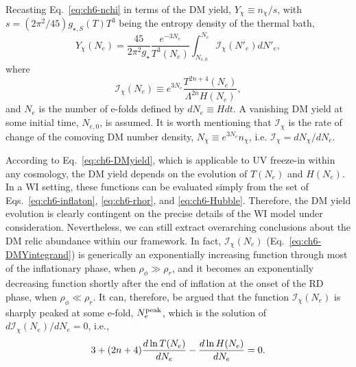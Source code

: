 Recasting Eq.~\eqref{eq:ch6-nchi} in terms of the DM yield, $Y_\chi\equiv n_\chi / s$, with $s=(2\pi^2/45)g_{\star, S}(T)T^3$ being the entropy density of the thermal bath,
\begin{equation}
 Y_\chi(N_e)=\frac{45}{2\pi^2g_\star}\frac{e^{-3N_e}}{ T^3(N_e)}\int_{N_{e, 0}}^{N_e}\mathcal{I}_\chi(N'_e) dN'_e,
 \label{eq:ch6-DMyield}
\end{equation}
where
\begin{equation}
    \mathcal{I}_\chi(N_e)\equiv e^{3N_e}\frac{T^{2n+4}(N_e)}{\Lambda^{2n}H(N_e)}, \label{eq:ch6-DMYintegrand}
\end{equation}
and $N_e$ is the number of e-folds defined by $dN_e\equiv Hdt$. A vanishing DM yield at some initial time, $N_{e, 0}$, is assumed.
It is worth mentioning that $\mathcal{I}_\chi$ is the rate of change of the comoving DM number density, $N_\chi\equiv e^{3N_e}n_\chi$, i.e.  $\mathcal{I}_\chi= dN_\chi/dN_e$.

According to Eq.~\eqref{eq:ch6-DMyield}, which is applicable to UV freeze-in within any cosmology, the DM yield depends on the evolution of $T(N_e)$ and $H(N_e)$. In a WI setting, these functions can be evaluated simply from the set of Eqs.~\eqref{eq:ch6-inflaton}, \eqref{eq:ch6-rhor}, and \eqref{eq:ch6-Hubble}. Therefore, the DM yield evolution is clearly contingent on the precise details of the WI model under consideration.
Nevertheless, we can still extract overarching conclusions about the DM relic abundance within our framework. In fact, $\mathcal{I}_\chi(N_e)$ (Eq.~\eqref{eq:ch6-DMYintegrand}) is generically an exponentially increasing function through most of the inflationary phase, when $\rho_\phi\gg \rho_r$, and it becomes an exponentially decreasing function shortly after the end of inflation at the onset of the RD phase, when $\rho_\phi\ll \rho_r$. It can, therefore, be argued that the function $\mathcal{I}_\chi(N_e)$
is sharply peaked at some e-fold, $N_{e}^{\rm{peak}}$, which is the solution of  $d \mathcal{I}_\chi(N_e) / dN_e = 0$, i.e.,
\begin{equation}
 3+(2n+4)\frac{d\,{\rm ln}\,T(N_e)}{dN_e}-\frac{d\,{\rm ln}\,H(N_e)}{dN_e}=0.
 \label{eq:ch6-Nemax}
\end{equation}

